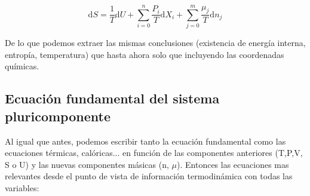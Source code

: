 \documentclass[12pt,a4paper]{article}
\newcommand{\D}{\mathrm{d}}
\begin{document}
\begin{equation}
\D S  =  \dfrac{1}{T} \D U + \sum_{i=0}^n \dfrac{P_i}{T} \D X_i + \sum_{j=0}^m \dfrac{\mu_j}{T} \D n_j  
\end{equation}

De lo que podemos extraer las mismas conclusiones (existencia de energía interna, entropía, temperatura) que hasta ahora solo que incluyendo las coordenadas químicas. 

\subsection{Ecuación fundamental del sistema pluricomponente}
Al igual que antes, podemos escribir tanto la ecuación fundamental como las ecuaciones térmicas, calóricas... en función de las componentes anteriores (T,P,V, S o U) y las nuevas componentes másicas (n, $\mu$). Entonces las ecuaciones mas relevantes desde el punto de vista de información termodinámica con todas las variables:
\end{document}
